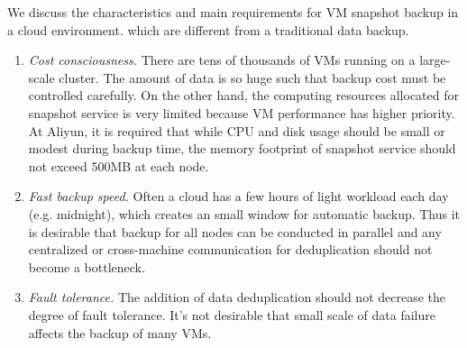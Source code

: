 We discuss the characteristics and 
main requirements for VM snapshot backup in a cloud environment.
which are different from a traditional data backup. 
\begin{enumerate}
\item {\em Cost consciousness.}
There are tens of thousands of VMs running on a large-scale cluster. 
The amount of data is so huge such that backup cost must be controlled carefully.
On the other hand, the computing resources allocated for snapshot service is very limited
because VM performance has higher priority.  
At Aliyun, it is required that while CPU and disk usage should be small or modest during backup time,
the memory footprint of snapshot service should not exceed 500MB at each node.

\item {\em Fast backup speed.}
Often a cloud has a few hours of light workload each day (e.g. midnight),  which creates an small window for automatic backup.
Thus it is desirable that backup for all nodes
can be conducted in parallel and any centralized or  cross-machine communication for
deduplication should not become a bottleneck.

\item {\em Fault tolerance.}
The addition of data deduplication should not decrease the degree of
fault tolerance. It's not desirable that small scale of data failure affects the backup of many VMs.
\end{enumerate}


